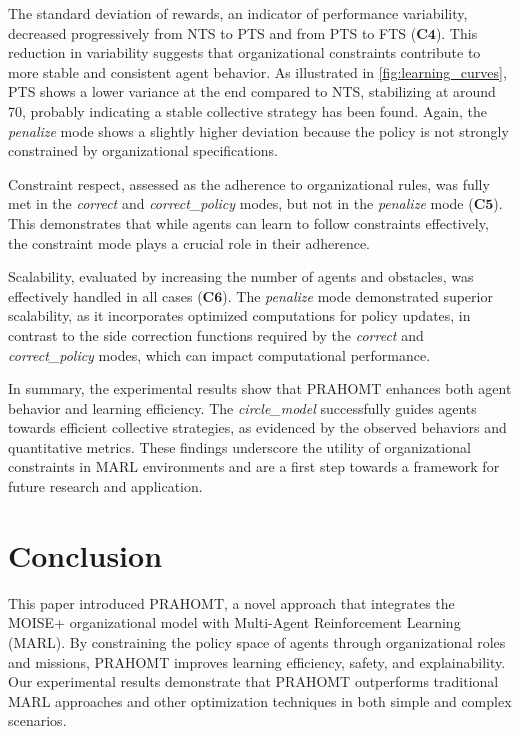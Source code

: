 \documentclass[sigconf,anonymous]{aamas}
\begin{document}
The standard deviation of rewards, an indicator of performance variability, decreased progressively from NTS to PTS and from PTS to FTS ($\mathbf{C4}$). This reduction in variability suggests that organizational constraints contribute to more stable and consistent agent behavior. As illustrated in \autoref{fig:learning_curves}, PTS shows a lower variance at the end compared to NTS, stabilizing at around 70, probably indicating a stable collective strategy has been found. Again, the \textit{penalize} mode shows a slightly higher deviation because the policy is not strongly constrained by organizational specifications.

Constraint respect, assessed as the adherence to organizational rules, was fully met in the \textit{correct} and \textit{correct\_policy} modes, but not in the \textit{penalize} mode ($\mathbf{C5}$). This demonstrates that while agents can learn to follow constraints effectively, the constraint mode plays a crucial role in their adherence.

Scalability, evaluated by increasing the number of agents and obstacles, was effectively handled in all cases ($\mathbf{C6}$). The \textit{penalize} mode demonstrated superior scalability, as it incorporates optimized computations for policy updates, in contrast to the side correction functions required by the \textit{correct} and \textit{correct\_policy} modes, which can impact computational performance.

In summary, the experimental results show that PRAHOMT enhances both agent behavior and learning efficiency. The \textit{circle\_model} successfully guides agents towards efficient collective strategies, as evidenced by the observed behaviors and quantitative metrics. These findings underscore the utility of organizational constraints in MARL environments and are a first step towards a framework for future research and application.




\section{Conclusion}
This paper introduced PRAHOMT, a novel approach that integrates the MOISE+ organizational model with Multi-Agent Reinforcement Learning (MARL). By constraining the policy space of agents through organizational roles and missions, PRAHOMT improves learning efficiency, safety, and explainability. Our experimental results demonstrate that PRAHOMT outperforms traditional MARL approaches and other optimization techniques in both simple and complex scenarios.
\end{document}

